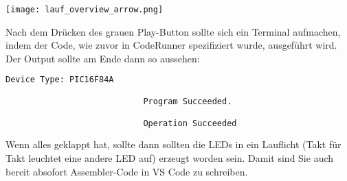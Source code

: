 \begin{center}
    \texttt{[image: lauf\_overview\_arrow.png]}
\end{center}
Nach dem Drücken des grauen Play-Button sollte sich ein Terminal aufmachen, indem der Code, wie zuvor in CodeRunner spezifiziert wurde, ausgeführt wird. Der Output sollte am Ende dann so aussehen:
\begin{lstlisting}[language=bash]
                            Device Type: PIC16F84A

                            Program Succeeded.

                            Operation Succeeded 
\end{lstlisting}
Wenn alles geklappt hat, sollte dann sollten die LEDs in ein Lauflicht (Takt für Takt leuchtet eine andere LED auf) erzeugt worden sein. Damit sind Sie auch bereit absofort Assembler-Code in VS Code zu schreiben.